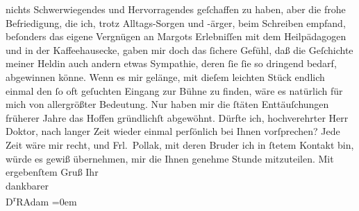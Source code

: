 \begin{ledgroupsized}[t]{13cm}
               nichts Schwerwiegendes und Hervorragendes geſchaffen zu haben, aber die frohe
               Befriedigung, die ich, trotz Alltags-Sorgen und -ärger, beim Schreiben {\pb}empfand, beſonders das eigene Vergnügen an
                  Margots Erlebniſſen mit dem
               Heilpädagogen und in der Kaffeehausecke, gaben mir doch das ſichere Gefühl, daß die
               Geſchichte meiner Heldin auch andern etwas Sympathie, deren ſie ſie so dringend
               bedarf, abgewinnen könne. Wenn es mir gelänge, mit dieſem leichten Stück endlich
               einmal den ſo oft geſuchten Eingang zur Bühne zu finden, wäre es natürlich für mich
               von allergrößter Bedeutung. Nur haben mir die ſtäten Enttäuſchungen früherer Jahre
               das Hoffen gründlichſt abgewöhnt.\pend
           \pstart
           {\pb}Dürfte ich, hochverehrter Herr Doktor,
               nach langer Zeit wieder einmal perſönlich bei Ihnen vorſprechen? Jede Zeit wäre mir
               recht, und Frl. Pollak, mit deren Bruder ich in ſtetem Kontakt
               bin, würde es gewiß übernehmen, mir die Ihnen genehme Stunde mitzuteilen.\pend
           \pstart
           Mit ergebenſtem Gruß Ihr{\\[\baselineskip]}dankbarer{\\[\baselineskip]}\spacefill\mbox{D\textsuperscript{r}RAdam}\pend
           \leftskip=0em{}
         
         \endnumbering{}\end{ledgroupsized}  \newcommand{\dateiname}{L02510}\newcommand{\titel}{Robert Adam an Arthur Schnitzler, 7. 6. 1929}\newcommand{\editorInnen}{Martin Anton Müller und Gerd-Hermann Susen}
      